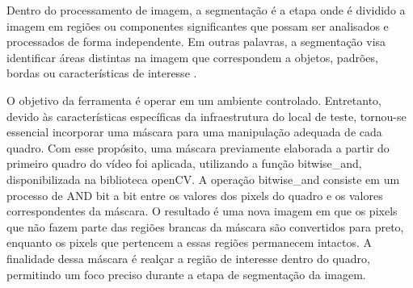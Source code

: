 Dentro do processamento de imagem, a segmentação é a etapa onde é dividido a imagem em regiões ou componentes significantes que possam ser analisados e processados de forma independente. Em outras palavras, a segmentação visa identificar áreas distintas na imagem que correspondem a objetos, padrões, bordas ou características de interesse \cite{imagemMonocromatica}.

O objetivo da ferramenta é operar em um ambiente controlado. Entretanto, devido às características específicas da infraestrutura do local de teste, tornou-se essencial incorporar uma máscara para uma manipulação adequada de cada quadro. Com esse propósito, uma máscara previamente elaborada a partir do primeiro quadro do vídeo foi aplicada, utilizando a função bitwise\_and, disponibilizada na biblioteca \ac{openCV}. A operação bitwise\_and consiste em um processo de AND bit a bit entre os valores dos pixels do quadro e os valores correspondentes da máscara. O resultado é uma nova imagem em que os pixels que não fazem parte das regiões brancas da máscara são convertidos para preto, enquanto os pixels que pertencem a essas regiões permanecem intactos. A finalidade dessa máscara é realçar a região de interesse dentro do quadro, permitindo um foco preciso durante a etapa de segmentação da imagem.

